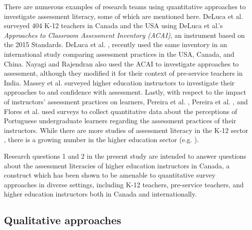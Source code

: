 \documentclass[
]{book}
\begin{document}
There are numerous examples of research teams using quantitative approaches to investigate assessment literacy, some of which are mentioned here. DeLuca et al. \citeyearpar{delucaTeachersApproachesClassroom2016} surveyed 404 K-12 teachers in Canada and the USA using DeLuca et al.'s \citeyearpar{delucaApproachesClassroomAssessment2016} \emph{Approaches to Classroom Assessment Inventory (ACAI)}, an instrument based on the 2015 Standards. DeLuca et al. \citeyearpar{delucaExploringAssessmentCultures2021}, recently used the same inventory in an international study comparing assessment practices in the USA, Canada, and China. Nayagi and Rajendran \citeyearpar{nayaginPreserviceTeachersApproaches2020} also used the ACAI to investigate approaches to assessment, although they modified it for their context of pre-service teachers in India. Massey et al. \citeyearpar{masseyAssessmentLiteracyCollege2020} surveyed higher education instructors to investigate their approaches to and confidence with assessment. Lastly, with respect to the impact of instructors' assessment practices on learners, Pereira et al. \citeyearpar{pereiraHowUndergraduatesPerceive2021}, Pereira et al. \citeyearpar{pereiraPerceptionsPortugueseUndergraduate2017}, and Flores et al. \citeyearpar{floresPerceptionsEffectivenessFairness2015} used surveys to collect quantitative data about the perceptions of Portuguese undergraduate learners regarding the assessment practices of their instructors. While there are more studies of assessment literacy in the K-12 sector \citep{medlandAssessmentIlliterateShared2019}, there is a growing number in the higher education sector (e.g. \citep{masseyAssessmentLiteracyCollege2020, nayaginPreserviceTeachersApproaches2020, pereiraHowUndergraduatesPerceive2021}).

Research questions 1 and 2 in the present study are intended to answer questions about the assessment literacies of higher education instructors in Canada, a construct which has been shown to be amenable to quantitative survey approaches in diverse settings, including K-12 teachers, pre-service teachers, and higher education instructors both in Canada and internationally.

\hypertarget{qualitative-approaches}{%
\subsection{Qualitative approaches}\label{qualitative-approaches}}
\end{document}
